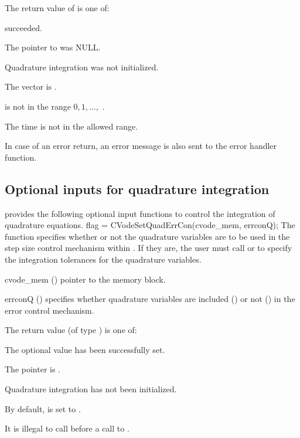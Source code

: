 {
  The return value  of  is one of:
  \begin{args}
  \item[\Id{CV\_SUCCESS}]
     succeeded.
  \item[\Id{CV\_MEM\_NULL}]
    The pointer to  was NULL.
  \item[\Id{CV\_NO\_QUAD}]
    Quadrature integration was not initialized.
  \item[\Id{CV\_BAD\_DKY}]
    The vector  is .
  \item[\Id{CV\_BAD\_K}]
     is not in the range $0, 1, \ldots,$ .
  \item[\Id{CV\_BAD\_T}]
    The time  is not in the allowed range.
  \end{args}
}
{
  In case of an error return, an error message is also sent to the error handler function.
}


\subsection{Optional inputs for quadrature integration}\label{ss:quad_optional_input}
{\cvodes} provides the following optional input functions to control the integration
of quadrature equations.
{
 flag = CVodeSetQuadErrCon(cvode\_mem, errconQ);
}
{
  The function  specifies whether or not the
  quadrature variables are to be used in the step size control mechanism
  within {\cvodes}.  If they are, the user must call 
  or  to specify the
  integration tolerances for the quadrature variables.
}
{
  \begin{args}
  \item[cvode\_mem] ()
    pointer to the {\cvodes} memory block.
  \item[errconQ] ()
    specifies whether quadrature variables are included () or not
    () in the error control mechanism.
  \end{args}
}
{
  The return value  (of type ) is one of:
  \begin{args}
  \item[\Id{CV\_SUCCESS}]
    The optional value has been successfully set.
  \item[\Id{CV\_MEM\_NULL}]
    The  pointer is .
  \item[\Id{CV\_NO\_QUAD}]
    Quadrature integration has not been initialized.
  \end{args}
}
{
  By default,  is set to .

  {\warn}It is illegal to call  before a call
  to .
}


